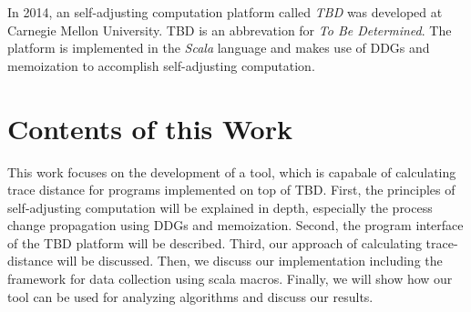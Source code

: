 In 2014, an self-adjusting computation platform called \textit{TBD} was developed at Carnegie Mellon University. TBD is an abbrevation for \textit{To Be Determined}. The platform is implemented in the \textit{Scala} language and makes use of DDGs and memoization to accomplish self-adjusting computation. 

\section{Contents of this Work}

This work focuses on the development of a tool, which is capabale of calculating trace distance for programs implemented on top of TBD. First, the principles of self-adjusting computation will be explained in depth, especially the process change propagation using DDGs and memoization. Second, the program interface of the TBD platform will be described. Third, our approach of calculating trace-distance will be discussed. Then, we discuss our implementation including the framework for data collection using scala macros. 
Finally, we will show how our tool can be used for analyzing algorithms and discuss our results. 
